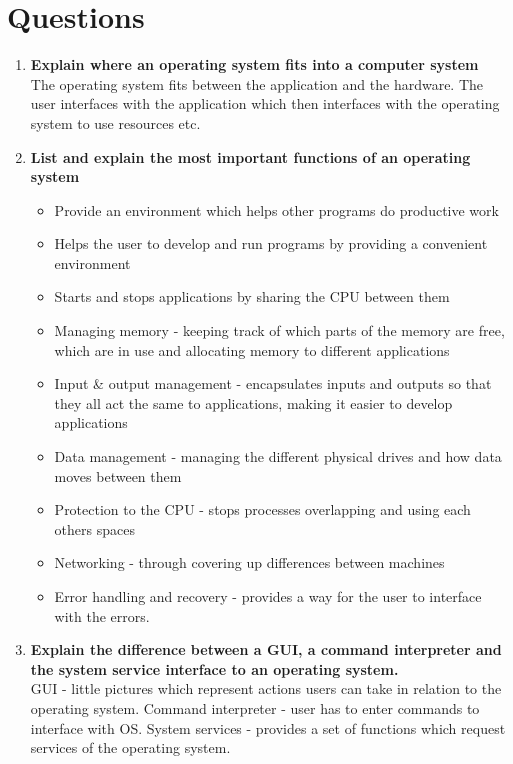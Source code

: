 
\section{Questions}
\begin{enumerate}
    \item \textbf{Explain where an operating system fits into a computer system}\\
    The operating system fits between the application and the hardware. The user interfaces with the application which then interfaces with the operating system to use resources etc.
    \item \textbf{List and explain the most important functions of an operating system}
    \begin{itemize}
        \item Provide an environment which helps other programs do productive work
        \item Helps the user to develop and run programs by providing a convenient environment
        \item Starts and stops applications by sharing the CPU between them
        \item Managing memory - keeping track of which parts of the memory are free, which are in use and allocating memory to different applications
        \item Input \& output management - encapsulates inputs and outputs so that they all act the same to applications, making it easier to develop applications
        \item Data management - managing the different physical drives and how data moves between them
        \item Protection to the CPU - stops processes overlapping and using each others spaces
        \item Networking - through covering up differences between machines
        \item Error handling and recovery - provides a way for the user to interface with the errors.
    \end{itemize}
    \item \textbf{Explain the difference between a GUI, a command interpreter and the system service interface to an operating system. }\\
    GUI - little pictures which represent actions users can take in relation to the operating system. Command interpreter - user has to enter commands to interface with OS. System services - provides a set of functions which request services of the operating system.

\end{enumerate}
